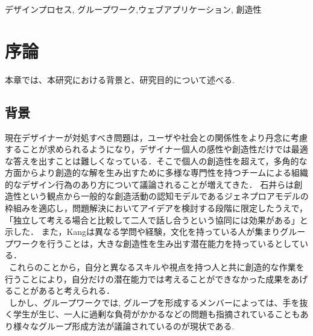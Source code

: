 \documentclass{funthesis}
\begin{document}
\begin{jkeyword}
デザインプロセス, グループワーク,ウェブアプリケーション, 創造性
\end{jkeyword}

\tableofcontents %


\chapter{序論} %

本章では、本研究における背景と、研究目的について述べる.


\section{背景} %


現在デザイナーが対処すべき問題は，ユーザや社会との関係性をより丹念に考慮することが求められるようになり，デザイナー個人の感性や創造性だけでは最適な答えを出すことは難しくなっている．そこで個人の創造性を超えて，多角的な方面からより創造的な解を生み出すために多様な専門性を持つチームによる組織的なデザイン行為のあり方について議論されることが増えてきた．\cite{A1} 石井らは創造性という観点から一般的な創造活動の認知モデルであるジェネプロアモデルの枠組みを適応し，問題解決においてアイデアを検討する段階に限定したうえで，「独立して考える場合と比較して二人で話し合うという協同には効果がある」と示した\cite{A2}． また，Kangは異なる学問や経験，文化を持っている人が集まりグループワークを行うことは，大きな創造性を生み出す潜在能力を持っている\cite{A3}としている．\\
\ これらのことから，自分と異なるスキルや視点を持つ人と共に創造的な作業を行うことにより，自分だけの潜在能力では考えることができなかった成果をあげることがあると考えられる．\\
\ しかし、グループワークでは, グループを形成するメンバーによっては、手を抜く学生が生じ、一人に過剰な負荷がかかるなどの問題も指摘されていることもあり\cite{A4}様々なグループ形成方法が議論されているのが現状である.
\end{document}
